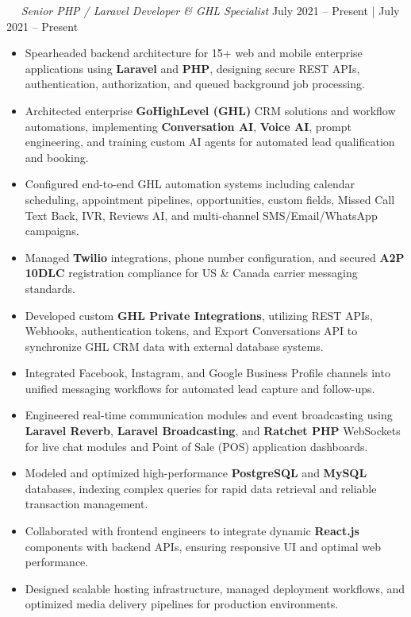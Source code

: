 \documentclass[11pt,letterpaper]{article}
\newcommand{\resumeHeading}[4]{%
  \noindent{\bfseries\color{primary} #1} \ \textbullet\ {\itshape\color{secondary} #2} \hfill {\small\color{secondary}\ifx\relax#3\relax #4\else #3 | #4\fi}\par\vspace{2pt}%
}
\newenvironment{bullets}{%
  \begin{itemize}[leftmargin=1.2em, itemsep=2.5pt, parsep=0pt, topsep=2pt, partopsep=0pt]%
}{%
  \end{itemize}\vspace{2pt}%
}
\begin{document}
\resumeHeading{\newline OC ANALYTICA}{Senior PHP / Laravel Developer \& GHL Specialist}{}{July 2021 -- Present}
\begin{bullets}
    \item Spearheaded backend architecture for 15+ web and mobile enterprise applications using \textbf{Laravel} and \textbf{PHP}, designing secure REST APIs, authentication, authorization, and queued background job processing.
    \item Architected enterprise \textbf{GoHighLevel (GHL)} CRM solutions and workflow automations, implementing \textbf{Conversation AI}, \textbf{Voice AI}, prompt engineering, and training custom AI agents for automated lead qualification and booking.
    \item Configured end-to-end GHL automation systems including calendar scheduling, appointment pipelines, opportunities, custom fields, Missed Call Text Back, IVR, Reviews AI, and multi-channel SMS/Email/WhatsApp campaigns.
    \item Managed \textbf{Twilio} integrations, phone number configuration, and secured \textbf{A2P 10DLC} registration compliance for US \& Canada carrier messaging standards.
    \item Developed custom \textbf{GHL Private Integrations}, utilizing REST APIs, Webhooks, authentication tokens, and Export Conversations API to synchronize GHL CRM data with external database systems.
    \item Integrated Facebook, Instagram, and Google Business Profile channels into unified messaging workflows for automated lead capture and follow-ups.
    \item Engineered real-time communication modules and event broadcasting using \textbf{Laravel Reverb}, \textbf{Laravel Broadcasting}, and \textbf{Ratchet PHP} WebSockets for live chat modules and Point of Sale (POS) application dashboards.
    \item Modeled and optimized high-performance \textbf{PostgreSQL} and \textbf{MySQL} databases, indexing complex queries for rapid data retrieval and reliable transaction management.
    \item Collaborated with frontend engineers to integrate dynamic \textbf{React.js} components with backend APIs, ensuring responsive UI and optimal web performance.
    \item Designed scalable hosting infrastructure, managed deployment workflows, and optimized media delivery pipelines for production environments.\newline
\end{bullets}
\end{document}
